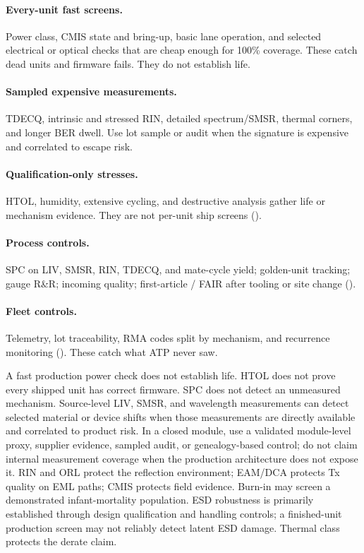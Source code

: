 \paragraph{Every-unit fast screens.}
Power class, CMIS state and bring-up, basic lane operation, and selected
electrical or optical checks that are cheap enough for 100\% coverage. These
catch dead units and firmware fails. They do not establish life.

\paragraph{Sampled expensive measurements.}
TDECQ, intrinsic and stressed RIN, detailed spectrum/SMSR, thermal corners, and
longer BER dwell. Use lot sample or audit when the signature is expensive and
correlated to escape risk.

\paragraph{Qualification-only stresses.}
HTOL, humidity, extensive cycling, and destructive analysis gather life or
mechanism evidence. They are not per-unit ship screens
().

\paragraph{Process controls.}
SPC on LIV, SMSR, RIN, TDECQ, and mate-cycle yield; golden-unit tracking; gauge
R\&R; incoming quality; first-article / FAIR after tooling or site change
().

\paragraph{Fleet controls.}
Telemetry, lot traceability, RMA codes split by mechanism, and recurrence
monitoring (). These catch what ATP never saw.

A fast production power check does not establish life. HTOL does not prove every
shipped unit has correct firmware. SPC does not detect an unmeasured mechanism.
Source-level LIV, SMSR, and wavelength measurements can detect selected material
or device shifts when those measurements are directly available and correlated
to product risk. In a closed module, use a validated module-level proxy,
supplier evidence, sampled audit, or genealogy-based control; do not claim
internal measurement coverage when the production architecture does not expose
it. RIN and ORL protect the reflection environment; EAM/DCA protects Tx quality
on EML paths; CMIS protects field evidence. Burn-in may screen a demonstrated
infant-mortality population. ESD robustness is primarily established through
design qualification and handling controls; a finished-unit production screen
may not reliably detect latent ESD damage. Thermal class protects the derate
claim.

